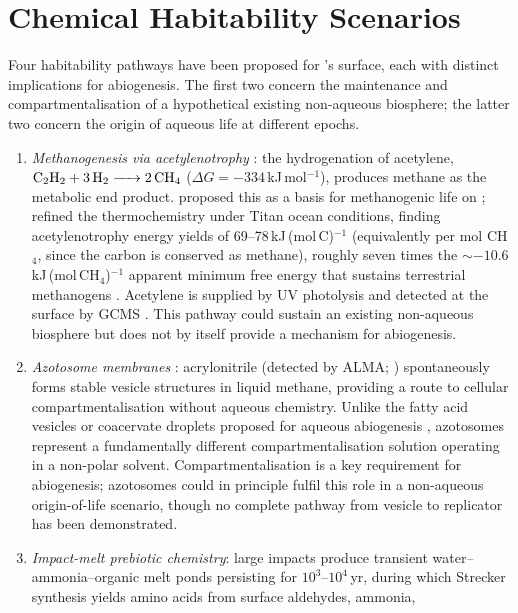 \section{Chemical Habitability Scenarios}
\label{sec:prior_theory}

Four habitability pathways have been proposed for \titan{}'s surface, each with distinct implications for abiogenesis. The first two concern the maintenance and compartmentalisation of a hypothetical existing non-aqueous biosphere; the latter two concern the origin of aqueous life at different epochs.

\begin{enumerate}
    \item \textit{Methanogenesis via acetylenotrophy} \citep{McKaySmith2005,Yanez2024}: the hydrogenation of acetylene,
$\ce{C2H2 + 3H2 -> 2CH4}$ ($\Delta G = -334$\,kJ\,mol$^{-1}$), produces methane as the metabolic end product.  \citet{McKaySmith2005} proposed this as a basis for methanogenic life on \titan{}; \citet{Yanez2024} refined the thermochemistry under Titan ocean conditions, finding acetylenotrophy energy yields of 69--78\,kJ\,(mol\,C)$^{-1}$ (equivalently per mol CH$_4$, since the carbon is conserved as methane), roughly seven times the $\sim$$-10.6$\,kJ\,(mol\,CH$_4$)$^{-1}$ apparent minimum free energy that sustains terrestrial methanogens \citep{Hoehler2001}.  Acetylene is supplied by UV
photolysis and detected at the surface by GCMS \citep{Niemann2005}.  This pathway could sustain an existing non-aqueous biosphere but does not by itself provide a mechanism for abiogenesis.
    \item \textit{Azotosome membranes} \citep{Stevenson2015}: acrylonitrile (detected by
ALMA; \citealt{Palmer2017}) spontaneously forms stable vesicle structures in
liquid methane, providing a route to cellular compartmentalisation without
aqueous chemistry.  Unlike the fatty acid vesicles or coacervate droplets proposed for aqueous abiogenesis \citep{Ruiz-Mirazo2014}, azotosomes represent a fundamentally different compartmentalisation solution operating in a non-polar solvent.  Compartmentalisation is a key requirement for abiogenesis; azotosomes could in principle fulfil this role in a non-aqueous origin-of-life scenario, though no complete pathway from vesicle to replicator has been demonstrated.
    \item \textit{Impact-melt prebiotic chemistry}: large impacts produce transient
water--ammonia--organic melt ponds persisting for $10^3$--$10^4$\,yr, during
which Strecker synthesis yields amino acids from surface aldehydes, ammonia,
$$
\end{enumerate}
